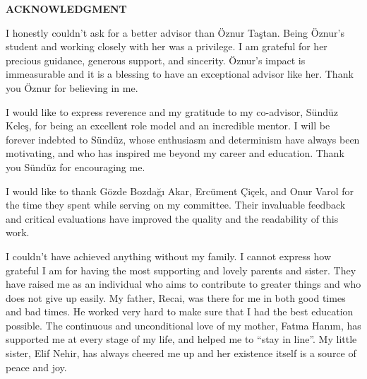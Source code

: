 \clearpage
\setlength{\parindent}{0pt}
\begin{center}
	\MakeUppercase{\textbf{acknowledgment}} \\ [3\baselineskip]
\end{center}

I honestly couldn't ask for a better advisor than Öznur Taştan.
Being Öznur's student and working closely with her was a privilege.
I am grateful for her precious guidance, generous support, and sincerity.
Öznur's impact is immeasurable and it is a blessing to have an exceptional advisor like her.
Thank you Öznur for believing in me.

I would like to express reverence and my gratitude to my co-advisor, Sündüz Keleş, for being an excellent role model and an incredible mentor.
I will be forever indebted to Sündüz, whose enthusiasm and determinism have always been motivating, and who has inspired me beyond my career and education.
Thank you Sündüz for encouraging me.


I would like to thank Gözde Bozdağı Akar, Ercüment Çiçek, and Onur Varol for the time they spent while serving on my committee.
Their invaluable feedback and critical evaluations have improved the quality and the readability of this work.


I couldn't have achieved anything without my family.
I cannot express how grateful I am for having the most supporting and lovely parents and sister.
They have raised me as an individual who aims to contribute to greater things and who does not give up easily.
My father, Recai, was there for me in both good times and bad times.
He worked very hard to make sure that I had the best education possible.
The continuous and unconditional love of my mother, Fatma Hanım, has supported me at every stage of my life, and helped me to ``stay in line''.
My little sister, Elif Nehir, has always cheered me up and her existence itself is a source of peace and joy.

